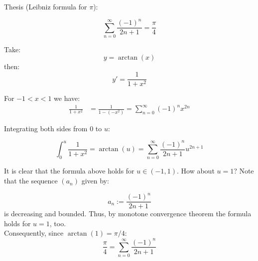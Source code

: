 \documentclass[12pt]{article}
\begin{document}
\noindent Thesis (Leibniz formula for $\pi$):

$$ \sum_{n=0}^{\infty} \frac{(-1)^n}{2n+1} = \frac{\pi}{4} $$

\noindent Take:
$$ y = \arctan(x) $$
then:
$$ y' = \frac{1}{1+x^2} $$

\noindent For $-1 < x < 1$ we have:
\begin{eqnarray*}
\frac{1}{1+x^2} &= \displaystyle\frac{1}{1 - (-x^2)} = \displaystyle\sum_{n=0}^{\infty} (-1)^n x^{2n}
\end{eqnarray*}

\noindent Integrating both sides from $0$ to $u$:

\begin{equation*}
\int_{0}^{u} \frac{1}{1+x^2} = \arctan(u) = \sum_{n=0}^{\infty} \frac{(-1)^n}{2n+1} u^{2n+1}
\end{equation*}

\noindent It is clear that the formula above holds for $u \in (-1, 1)$. How about $u=1$?
Note that the sequence $(a_n)$ given by:

$$
a_n := \frac{(-1)^n}{2n+1} 
$$
is decreasing and bounded. Thus, by monotone convergence theorem the formula holds for $u=1$, too.
\\ \noindent Consequently, since $\arctan(1) = \pi/4$:
$$
\frac{\pi}{4} = \sum_{n=0}^{\infty} \frac{(-1)^n}{2n + 1}
$$
\end{document}
